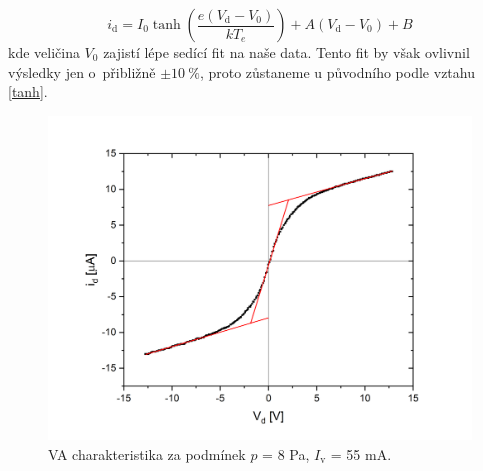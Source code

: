 \documentclass[a4paper,12pt]{article}
\begin{document}
\begin{equation}
	i_\text{{d}} = I_0 \tanh\left( \frac{e (V_\text{d} - V_0) }{k T_e} \right) + A (V_\text{d} - V_0) + B 
\end{equation}
kde veličina $V_0$ zajistí lépe sedící fit na naše data.
Tento fit by však ovlivnil výsledky jen
o~přibližně $\pm 10~\%$, proto zůstaneme u původního podle
vztahu \eqref{tanh}.

\newpage
\begin{figure}[h!]
	\centering
	\includegraphics[width=130mm]{dvojna1.png}
	\caption{VA charakteristika za podmínek $p$ = 8 \si{\pascal}, $I_\text{{v}}$ = 55 \si{\milli\ampere}.}
	\label{dvojna1}
\end{figure}
\end{document}
